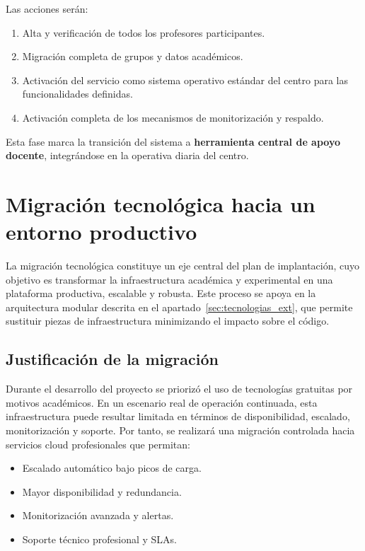 Las acciones serán:

\begin{enumerate}
    \item Alta y verificación de todos los profesores participantes.
    \item Migración completa de grupos y datos académicos.
    \item Activación del servicio como sistema operativo estándar del centro para las funcionalidades definidas.
    \item Activación completa de los mecanismos de monitorización y respaldo.
\end{enumerate}

Esta fase marca la transición del sistema a \textbf{herramienta central de apoyo docente}, integrándose en la operativa diaria del centro.

\section{Migración tecnológica hacia un entorno productivo}
\label{sec:migracion_tecnologica}

La migración tecnológica constituye un eje central del plan de implantación, cuyo objetivo es transformar la infraestructura académica y experimental en una plataforma productiva, escalable y robusta. Este proceso se apoya en la arquitectura modular descrita en el apartado~\ref{sec:tecnologias_ext}, que permite sustituir piezas de infraestructura minimizando el impacto sobre el código.

\subsection{Justificación de la migración}

Durante el desarrollo del proyecto se priorizó el uso de tecnologías gratuitas por motivos académicos. En un escenario real de operación continuada, esta infraestructura puede resultar limitada en términos de disponibilidad, escalado, monitorización y soporte. Por tanto, se realizará una migración controlada hacia servicios cloud profesionales que permitan:

\begin{itemize}
    \item Escalado automático bajo picos de carga.
    \item Mayor disponibilidad y redundancia.
    \item Monitorización avanzada y alertas.
    \item Soporte técnico profesional y SLAs.
\end{itemize}

